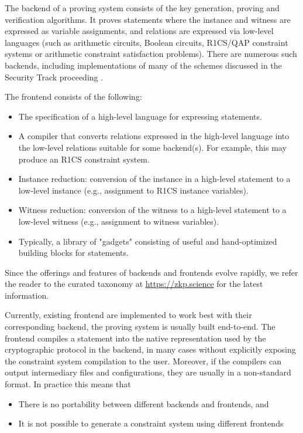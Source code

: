 \documentclass[a4paper,11pt]{article}
\newcommand{\dnote}[1]{\dtcolornote[Daniel]{red}{#1}}
\begin{document}
The backend of a proving system consists of the key generation, proving and verification algorithms. It proves statements where the instance and witness are expressed as variable assignments, and relations are expressed via low-level languages (such as arithmetic circuits, Boolean circuits, R1CS/QAP constraint systems or arithmetic constraint satisfaction problems). There are numerous such backends, including implementations of many of the schemes discussed in the Security Track proceeding \dnote{cite: security track proceeding}.

The frontend consists of the following:
\begin{itemize}
	\item The specification of a high-level language for expressing statements.
	\item A compiler that converts relations expressed in the high-level language into the low-level relations suitable for some backend(s). For example, this may produce an R1CS constraint system.
	\item Instance reduction: conversion of the instance in a high-level statement to a low-level instance (e.g., assignment to R1CS instance variables).
	\item Witness reduction: conversion of the witness to a high-level statement to a low-level witness (e.g., assignment to witness variables).
	\item Typically, a library of "gadgets" consisting of useful and hand-optimized building blocks for statements.
\end{itemize}

Since the offerings and features of backends and frontends evolve rapidly, we refer the reader to the curated taxonomy at \url{https://zkp.science} for the latest information.  

Currently, existing frontend are implemented to work best with their corresponding backend, the proving system is usually built end-to-end. The frontend compiles a statement into the native representation used by the cryptographic protocol in the backend, in many cases without explicitly exposing the constraint system compilation to the user. Moreover, if the compilers can output intermediary files and configurations, they are usually in a non-standard format. In practice this means that
\begin{itemize}
	\item There is no portability between different backends and frontends, and
	\item It is not possible to generate a constraint system using different frontends
\end{itemize}   
\end{document}
